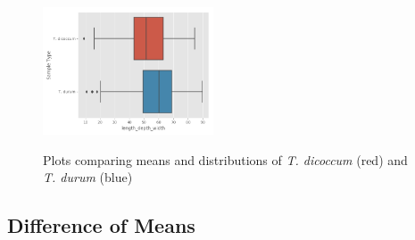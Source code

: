 \documentclass[11pt]{report}
\begin{document}
\begin{figure}[!ht]
{    \includegraphics[width=0.45\textwidth]{./images/results/group5/length_depth_width.png}
    }
  \caption{Plots comparing means and distributions of \textit{T. dicoccum} (red) and \textit{T. durum} (blue)}
  \label{fig:dummy}
\end{figure}
\clearpage
\subsection{Difference of Means}
\label{sec:org5f1c5b4}
\end{document}
